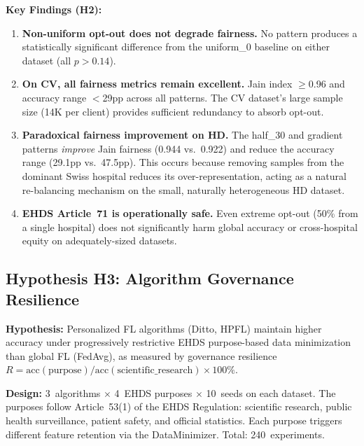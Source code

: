 \documentclass[conference]{IEEEtran}
\begin{document}
\noindent\textbf{Key Findings (H2):}
\begin{enumerate}
    \item \textbf{Non-uniform opt-out does not degrade fairness.} No pattern produces a statistically significant difference from the uniform\_0 baseline on either dataset (all $p{>}0.14$).
    \item \textbf{On CV, all fairness metrics remain excellent.} Jain index $\geq$0.96 and accuracy range $<$29pp across all patterns. The CV dataset's large sample size (14K per client) provides sufficient redundancy to absorb opt-out.
    \item \textbf{Paradoxical fairness improvement on HD.} The half\_30 and gradient patterns \textit{improve} Jain fairness (0.944 vs.\ 0.922) and reduce the accuracy range (29.1pp vs.\ 47.5pp). This occurs because removing samples from the dominant Swiss hospital reduces its over-representation, acting as a natural re-balancing mechanism on the small, naturally heterogeneous HD dataset.
    \item \textbf{EHDS Article~71 is operationally safe.} Even extreme opt-out (50\% from a single hospital) does not significantly harm global accuracy or cross-hospital equity on adequately-sized datasets.
\end{enumerate}

\subsection{Hypothesis H3: Algorithm Governance Resilience}
\label{sec:h3_resilience}

\textbf{Hypothesis:} Personalized FL algorithms (Ditto, HPFL) maintain higher accuracy under progressively restrictive EHDS purpose-based data minimization than global FL (FedAvg), as measured by governance resilience $R = \text{acc}(\text{purpose}) / \text{acc}(\text{scientific\_research}) \times 100\%$.

\textbf{Design:} 3~algorithms $\times$ 4~EHDS purposes $\times$ 10~seeds on each dataset. The purposes follow Article~53(1) of the EHDS Regulation: scientific research, public health surveillance, patient safety, and official statistics. Each purpose triggers different feature retention via the DataMinimizer. Total: 240~experiments.
\end{document}
